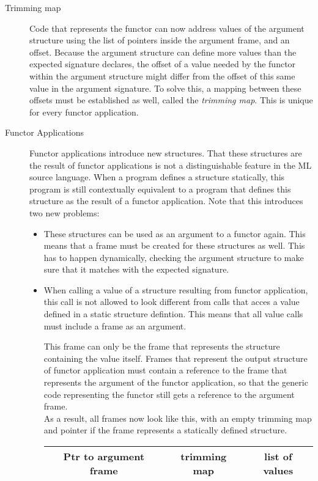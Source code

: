 \documentclass[11pt]{article}
\newcommand{\gray}{\cellcolor{lightgray}}
\begin{document}
\begin{description}
\item[Trimming map]
Code that represents the functor can now address values of the argument structure using the list of pointers inside the argument frame, and an offset.
Because the argument structure can define more values than the expected signature declares, the offset of a value needed by the functor within the argument structure might differ from the offset of this same value in the argument signature.
To solve this, a mapping between these offsets must be established as well, called the \emph{trimming map}. This is unique for every functor application.

\item[Functor Applications]
Functor applications introduce new structures. 
That these structures are the result of functor applications is not a distinguishable feature in the ML source language.
When a program defines a structure statically, this program is still contextually equivalent to a program that defines this structure as the result of a functor application.
Note that this introduces two new problems:
\begin{itemize}
\item 
These structures can be used as an argument to a functor again. This means that a frame must be created for these structures as well.
This has to happen dynamically, checking the argument structure to make sure that it matches with the expected signature.

\item When calling a value of a structure resulting from functor application, this call is not allowed to look different from calls that acces a value defined in a static structure defintion.
This means that all value calls must include a frame as an argument.

This frame can only be the frame that represents the structure containing the value itself.
Frames that represent the output structure of functor application must contain a reference to the frame that represents the argument of the functor application, so that the generic code representing the functor still gets a reference to the argument frame.
\\[2em]
As a result, all frames now look like this, with an empty trimming map and pointer if the frame represents a statically defined structure.

\begin{tabular}{|c c c|}
\hline
Ptr to argument frame & \gray trimming map &  list of values\\
\hline
\end{tabular}
\end{itemize}


\end{description}
\end{document}
